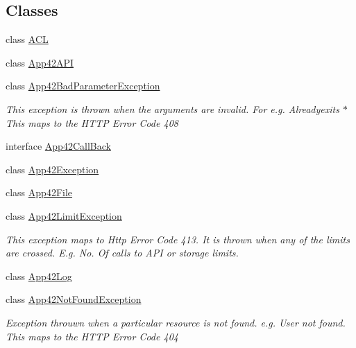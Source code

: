 \subsection*{Classes}
\begin{DoxyCompactItemize}
\item 
class \hyperlink{classcom_1_1shephertz_1_1app42_1_1paas_1_1sdk_1_1csharp_1_1_a_c_l}{A\+C\+L}
\item 
class \hyperlink{classcom_1_1shephertz_1_1app42_1_1paas_1_1sdk_1_1csharp_1_1_app42_a_p_i}{App42\+A\+P\+I}
\item 
class \hyperlink{classcom_1_1shephertz_1_1app42_1_1paas_1_1sdk_1_1csharp_1_1_app42_bad_parameter_exception}{App42\+Bad\+Parameter\+Exception}
\begin{DoxyCompactList}\small\item\em This exception is thrown when the arguments are invalid. For e.\+g. Alreadyexits $\ast$ This maps to the H\+T\+T\+P Error Code 408 \end{DoxyCompactList}\item 
interface \hyperlink{interfacecom_1_1shephertz_1_1app42_1_1paas_1_1sdk_1_1csharp_1_1_app42_call_back}{App42\+Call\+Back}
\item 
class \hyperlink{classcom_1_1shephertz_1_1app42_1_1paas_1_1sdk_1_1csharp_1_1_app42_exception}{App42\+Exception}
\item 
class \hyperlink{classcom_1_1shephertz_1_1app42_1_1paas_1_1sdk_1_1csharp_1_1_app42_file}{App42\+File}
\item 
class \hyperlink{classcom_1_1shephertz_1_1app42_1_1paas_1_1sdk_1_1csharp_1_1_app42_limit_exception}{App42\+Limit\+Exception}
\begin{DoxyCompactList}\small\item\em This exception maps to Http Error Code 413. It is thrown when any of the limits are crossed. E.\+g. No. Of calls to A\+P\+I or storage limits. \end{DoxyCompactList}\item 
class \hyperlink{classcom_1_1shephertz_1_1app42_1_1paas_1_1sdk_1_1csharp_1_1_app42_log}{App42\+Log}
\item 
class \hyperlink{classcom_1_1shephertz_1_1app42_1_1paas_1_1sdk_1_1csharp_1_1_app42_not_found_exception}{App42\+Not\+Found\+Exception}
\begin{DoxyCompactList}\small\item\em Exception throuwn when a particular resource is not found. e.\+g. User not found. This maps to the H\+T\+T\+P Error Code 404 \end{DoxyCompactList}\item 

\end{DoxyCompactItemize}
